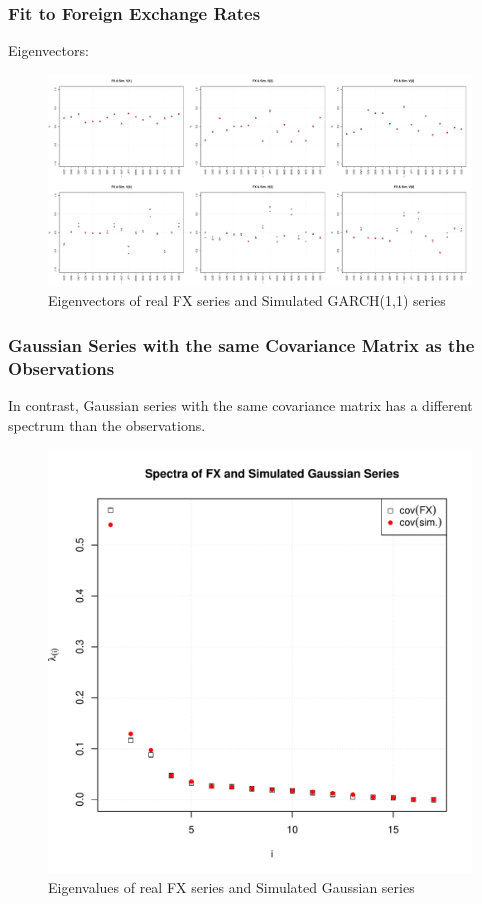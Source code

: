 \documentclass{beamer}
\begin{document}
\begin{frame}
  \frametitle{Fit to Foreign Exchange Rates}
  Eigenvectors:
  \begin{figure}[htb!]
    \centering
    \includegraphics[scale=0.2]{FX_eigenvectors.pdf}
    \caption{\scriptsize Eigenvectors of real FX series and Simulated GARCH(1,1) series}
  \end{figure}
\end{frame}

\begin{frame}
  \frametitle{Gaussian Series with the same Covariance Matrix as the
    Observations}
  In contrast, Gaussian series with the same covariance matrix has a
  different spectrum than the observations.
  \begin{figure}[htb!]
    \centering
    \includegraphics[scale=0.35]{Gaussian_eigenvalues.pdf}
    \caption{\scriptsize Eigenvalues of real FX series and Simulated Gaussian series}
  \end{figure}
\end{frame}
\end{document}
